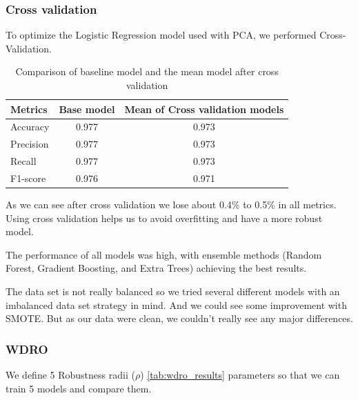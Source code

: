 \documentclass[12pt, a4paper]{article}
\begin{document}
\subsubsection{Cross validation}

To optimize the Logistic Regression model used with PCA, we performed Cross-Validation.

\begin{table}[H]
    \centering
    \begin{tabular}{lcc}
        \toprule
        \textbf{Metrics} & \textbf{Base model} & \textbf{Mean of Cross validation models} \\
        \midrule
        Accuracy & 0.977 & 0.973 \\
        Precision & 0.977 & 0.973 \\
        Recall & 0.977 & 0.973 \\
        F1-score & 0.976 & 0.971 \\
        \bottomrule
    \end{tabular}
    \caption{Comparison of baseline model and the mean model after cross validation}
    \label{tab:cv_results}
\end{table}

As we can see after cross validation we lose about 0.4\% to 0.5\% in all metrics. Using cross validation helps us to avoid overfitting and have a more robust model.

The performance of all models was high, with ensemble methods (Random Forest, Gradient Boosting, and Extra Trees) achieving the best results.

The data set is not really balanced so we tried several different models with an imbalanced data set strategy in mind. And we could see some improvement with SMOTE. But as our data were clean, we couldn't really see any major differences.

\subsubsection{WDRO}

We define 5 Robustness radii ($\rho$) \ref{tab:wdro_results} parameters so that we can train 5 models and compare them.
\end{document}
